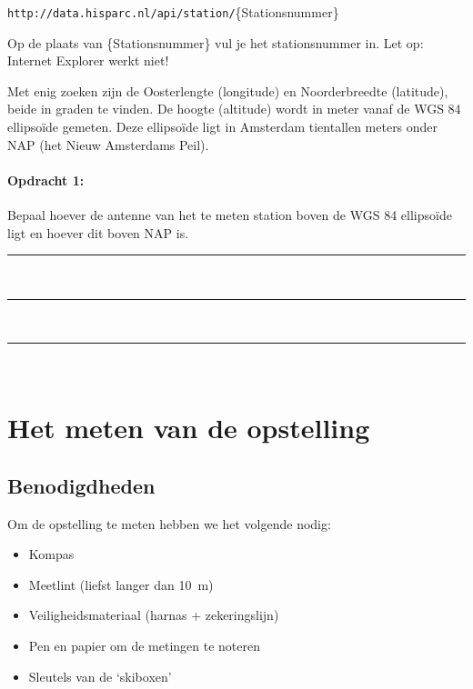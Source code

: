 \texttt{\small{http://data.hisparc.nl/api/station/}}{\small{\{Stationsnummer\}}}

Op de plaats van \{Stationsnummer\} vul je het stationsnummer in. Let
op: Internet Explorer werkt niet!

Met enig zoeken zijn de Oosterlengte (longitude) en Noorderbreedte
(latitude), beide in graden te vinden. De hoogte (altitude) wordt in
meter vanaf de WGS 84 ellipsoïde gemeten. Deze ellipsoïde ligt in
Amsterdam tientallen meters onder NAP (het Nieuw Amsterdams Peil).

\begin{minipage}[t]{1\columnwidth}%

\paragraph{Opdracht 1:}

Bepaal hoever de \gps antenne van het te meten station boven de WGS 84
ellipsoïde ligt en hoever dit boven NAP is.

\begin{center}
    \rule{\textwidth}{0.3mm}\\
    \rule{\textwidth}{0.3mm}\\
    \rule{\textwidth}{0.3mm}\\
\end{center}

\end{minipage}


\section{Het meten van de opstelling}


\subsection{Benodigdheden}

Om de opstelling te meten hebben we het volgende nodig:

\begin{itemize}
    \item Kompas
    \item Meetlint (liefst langer dan \SI{10}{\meter})
    \item Veiligheidsmateriaal (harnas + zekeringslijn)
    \item Pen en papier om de metingen te noteren
    \item Sleutels van de `skiboxen'
\end{itemize}

